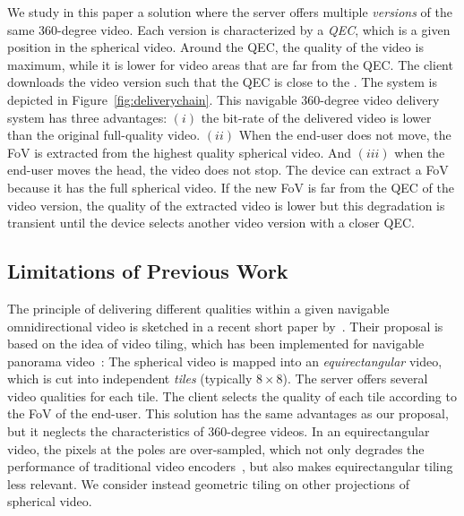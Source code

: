 We study in this paper a solution where the server offers multiple \emph{versions} of the same
360-degree video. Each version is characterized by a \emph{\ac{QEC}}, which is a given
position in the spherical video. Around the \ac{QEC}, the quality of the video is maximum,
while it is lower for video areas that are far from the \ac{QEC}.
The client downloads the video version
such that
the \ac{QEC} is close to the .
The system is depicted in Figure~\ref{fig:deliverychain}.
This navigable 360-degree video delivery system has three advantages:
$(i)$ the bit-rate of the delivered video is lower than the original full-quality video.
$(ii)$ When the end-user does not move, the \ac{FoV}  is extracted from the highest
quality spherical video.
And $(iii)$ when the end-user moves the head, the video does not stop. The device can
extract
a  \ac{FoV}  because it has the full spherical video. If the new \ac{FoV}  is far from the
\ac{QEC} of the video version, the quality of the extracted video is lower but this
degradation is transient until the
device selects another video version with a closer \ac{QEC}.



\subsection{Limitations of Previous Work}

The principle of delivering different qualities within a given navigable omnidirectional video is sketched
in a recent short paper by~\citet{ochi_live_2015}. Their proposal is based on the idea of video
tiling, which has been implemented for navigable panorama
video~\cite{sanchez_compressed_2015,wang_mixing_2014,gaddam_tiling_2015}:
The spherical video is mapped into an \emph{equirectangular} video, which
is cut into independent \emph{tiles} (typically $8\times 8$). The server offers several
video qualities for each tile. The client selects the quality of each tile according to
the \ac{FoV} of the end-user. This
solution has the same advantages as our proposal, but it neglects
the characteristics of 360-degree
videos. In an equirectangular video, the pixels
at the poles are over-sampled, which not only degrades the
performance of traditional video encoders~\cite{wojciechowski_h.264_2006,yu_framework_2015}, but also
makes equirectangular tiling less relevant. We consider instead geometric tiling on
other projections of spherical video.


